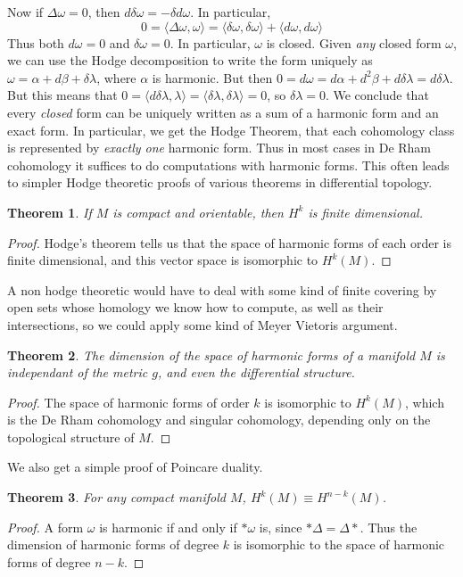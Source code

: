 \documentclass{article}
\theoremstyle{plain}
\newtheorem{theorem}{Theorem}
\theoremstyle{remark}
\theoremstyle{definition}
\begin{document}
Now if $\Delta \omega = 0$, then $d \delta \omega = - \delta d \omega$. In particular,
%
\[ 0 = \langle \Delta \omega, \omega \rangle = \langle \delta \omega, \delta \omega \rangle + \langle d \omega, d \omega \rangle \]
%
Thus both $d \omega = 0$ and $\delta \omega = 0$. In particular, $\omega$ is closed. Given {\it any} closed form $\omega$, we can use the Hodge decomposition to write the form uniquely as $\omega = \alpha + d \beta + \delta \lambda$, where $\alpha$ is harmonic. But then $0 = d \omega = d \alpha + d^2 \beta + d \delta \lambda = d \delta \lambda$. But this means that $0 = \langle d \delta \lambda, \lambda \rangle = \langle \delta \lambda, \delta \lambda \rangle = 0$, so $\delta \lambda = 0$. We conclude that every {\it closed} form can be uniquely written as a sum of a harmonic form and an exact form. In particular, we get the Hodge Theorem, that each cohomology class is represented by {\it exactly one} harmonic form. Thus in most cases in De Rham cohomology it suffices to do computations with harmonic forms. This often leads to simpler Hodge theoretic proofs of various theorems in differential topology.

\begin{theorem}
    If $M$ is compact and orientable, then $H^k$ is finite dimensional.
\end{theorem}
\begin{proof}
    Hodge's theorem tells us that the space of harmonic forms of each order is finite dimensional, and this vector space is isomorphic to $H^k(M)$.
\end{proof}

A non hodge theoretic would have to deal with some kind of finite covering by open sets whose homology we know how to compute, as well as their intersections, so we could apply some kind of Meyer Vietoris argument.

\begin{theorem}
    The dimension of the space of harmonic forms of a manifold $M$ is independant of the metric $g$, and even the differential structure.
\end{theorem}
\begin{proof}
    The space of harmonic forms of order $k$ is isomorphic to $H^k(M)$, which is the De Rham cohomology and singular cohomology, depending only on the topological structure of $M$.
\end{proof}

We also get a simple proof of Poincare duality.

\begin{theorem}
    For any compact manifold $M$, $H^k(M) \equiv H^{n-k}(M)$.
\end{theorem}
\begin{proof}
    A form $\omega$ is harmonic if and only if $* \omega$ is, since $* \Delta = \Delta *$. Thus the dimension of harmonic forms of degree $k$ is isomorphic to the space of harmonic forms of degree $n-k$.
\end{proof}
\end{document}
